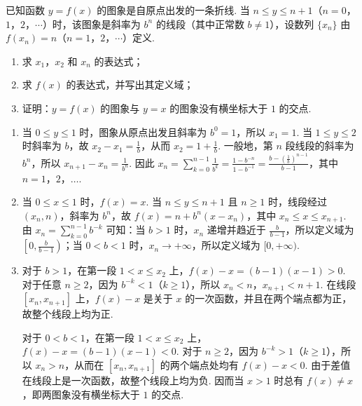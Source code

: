 \begin{problem}
已知函数 \(y=f(x)\) 的图象是自原点出发的一条折线. 当 \(n\leqslant y\leqslant n+1\)（\(n=0\)，\(1\)，\(2\)，\(\cdots\)）时，该图象是斜率为 \(b^n\) 的线段（其中正常数 \(b\neq 1\)），设数列 \(\{x_n\}\) 由 \(f(x_n)=n\)（\(n=1\)，\(2\)，\(\cdots\)）定义.

\begin{enumerate}
\item 求 \(x_1\)，\(x_2\) 和 \(x_n\) 的表达式；
\item 求 \(f(x)\) 的表达式，并写出其定义域；
\item 证明：\(y=f(x)\) 的图象与 \(y=x\) 的图象没有横坐标大于 \(1\) 的交点.
\end{enumerate}
\end{problem}

\begin{solution}
\begin{enumerate}
\item 当 \(0\leqslant y\leqslant1\) 时，图象从原点出发且斜率为 \(b^0=1\)，所以 \(x_1=1\). 当 \(1\leqslant y\leqslant2\) 时斜率为 \(b\)，故 \(x_2-x_1=\frac{1}{b}\)，从而 \(x_2=1+\frac{1}{b}\). 一般地，第 \(n\) 段线段的斜率为 \(b^n\)，所以 \(x_{n+1}-x_n=\frac{1}{b^n}\). 因此
\(x_n=\sum_{k=0}^{n-1}\frac{1}{b^k}=\frac{1-b^{-n}}{1-b^{-1}}=\frac{b-(\frac{1}{b})^{n-1}}{b-1}\)，其中 \(n=1\)，\(2\)，\(\ldots\).
\item 当 \(0\leqslant x\leqslant1\) 时，\(f(x)=x\). 当 \(n\leqslant y\leqslant n+1\) 且 \(n\geqslant1\) 时，线段经过 \((x_n,n)\)，斜率为 \(b^n\)，故 \(f(x)=n+b^n(x-x_n)\)，其中 \(x_n\leqslant x\leqslant x_{n+1}\). 由 \(x_n=\sum_{k=0}^{n-1}b^{-k}\) 可知：当 \(b>1\) 时，\(x_n\) 递增并趋近于 \(\frac{b}{b-1}\)，所以定义域为 \(\left[0,\frac{b}{b-1}\right)\)；当 \(0<b<1\) 时，\(x_n\to+\infty\)，所以定义域为 \([0,+\infty)\).
\item 对于 \(b>1\)，在第一段 \(1<x\leqslant x_2\) 上，\(f(x)-x=(b-1)(x-1)>0\). 对于任意 \(n\geqslant2\)，因为 \(b^{-k}<1\)（\(k\geqslant1\)），所以 \(x_n<n\)，\(x_{n+1}<n+1\). 在线段 \([x_n,x_{n+1}]\) 上，\(f(x)-x\) 是关于 \(x\) 的一次函数，并且在两个端点都为正，故整个线段上均为正.

对于 \(0<b<1\)，在第一段 \(1<x\leqslant x_2\) 上，\(f(x)-x=(b-1)(x-1)<0\). 对于 \(n\geqslant2\)，因为 \(b^{-k}>1\)（\(k\geqslant1\)），所以 \(x_n>n\)，从而在 \([x_n,x_{n+1}]\) 的两个端点处均有 \(f(x)-x<0\). 由于差值在线段上是一次函数，故整个线段上均为负. 因而当 \(x>1\) 时总有 \(f(x)\neq x\)，即两图象没有横坐标大于 \(1\) 的交点.
\end{enumerate}
\end{solution}

